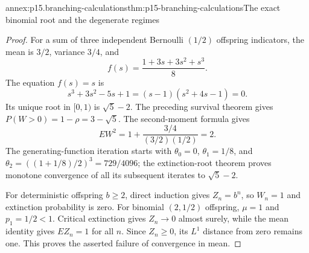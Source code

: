 \begin{annexitem}{annex:p15.branching-calculations}{thm:p15-branching-calculations}{The exact binomial root and the degenerate regimes}
\begin{proof}
For a sum of three independent Bernoulli \((1/2)\) offspring
indicators, the mean is \(3/2\), variance \(3/4\), and
\[
                           f(s)=\frac{1+3s+3s^2+s^3}{8}.
\]
The equation \(f(s)=s\) is
\[
               s^3+3s^2-5s+1=(s-1)(s^2+4s-1)=0.
\]
Its unique root in \([0,1)\) is \(\sqrt5-2\).
The preceding survival theorem gives
\(P(W>0)=1-\rho=3-\sqrt5\).
The second-moment formula gives
\[
                         EW^2=1+\frac{3/4}{(3/2)(1/2)}=2.
\]
The generating-function iteration starts with
\(\theta_0=0\), \(\theta_1=1/8\), and
\(\theta_2=((1+1/8)/2)^3=729/4096\);
the extinction-root theorem proves monotone convergence of all
its subsequent iterates to \(\sqrt5-2\).

For deterministic offspring \(b\geq2\), direct induction gives
\(Z_n=b^n\), so \(W_n=1\) and extinction probability is zero.
For binomial \((2,1/2)\) offspring, \(\mu=1\) and \(p_1=1/2<1\).
Critical extinction gives \(Z_n\to0\) almost surely, while the
mean identity gives \(EZ_n=1\) for all \(n\).
Since \(Z_n\geq0\), its \(L^1\) distance from zero remains one.
This proves the asserted failure of convergence in mean.
\end{proof}
\end{annexitem}


